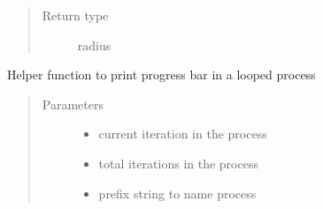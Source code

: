\documentclass[letterpaper,10pt,english,openany,oneside]{sphinxmanual}
\begin{document}
\begin{fulllineitems}
\begin{fulllineitems}
\begin{quote}
\begin{description}
\item[{Return type}] \leavevmode
radius

\end{description}\end{quote}

\end{fulllineitems}


\begin{fulllineitems}
\label{\detokenize{nloed:nloed.model.Model.__creategrid}}
\end{fulllineitems}


\begin{fulllineitems}
\label{\detokenize{nloed:nloed.model.Model._progress_bar}}
Helper function to print progress bar in a looped process
\begin{quote}\begin{description}
\item[{Parameters}] \leavevmode\begin{itemize}
\item {} 
 \textendash{} current iteration in the process

\item {} 
 \textendash{} total iterations in the process

\item {} 
 \textendash{} prefix string to name process

\end{itemize}

\end{description}\end{quote}

\end{fulllineitems}


\end{fulllineitems}
\end{document}
